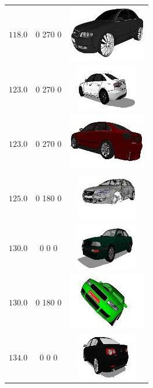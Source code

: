 \begin{longtable}{ccc}
	$118.0$ & 0 270 0 & \includegraphics{models/fa89e791e259c4ae4036d6f43287af40.jpg}\\
	$123.0$ & 0 270 0 & \includegraphics{models/8fdecf58b82b7c29ab7226ff499dce14.jpg}\\
	$123.0$ & 0 270 0 & \includegraphics{models/c09c9e2d85df1abf6a3f171e9d98eb02.jpg}\\
	$125.0$ & 0 180 0 & \includegraphics{models/50897c1915b25151aec18d92b687fb1.jpg}\\
	$130.0$ & 0 0 0 & \includegraphics{models/3d2fbd9bfdfe08573a93df79ef2b80ef.jpg}\\
	$130.0$ & 0 180 0 & \includegraphics{models/677c3f4038adf978f13fb2a3b1dc1c3c.jpg}\\
	$134.0$ & 0 0 0 & \includegraphics{models/6d296f7fae3f7f34981c1fca8c617850.jpg}\\

\end{longtable}
